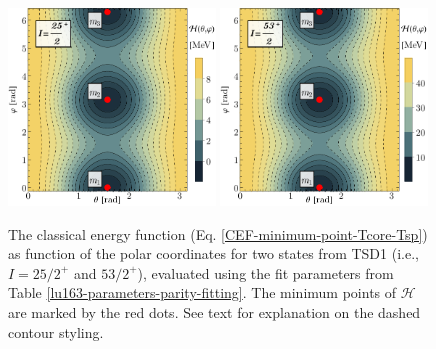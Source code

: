 \begin{figure}
    \centering
    \includegraphics[width=0.49\textwidth]{Chapters/Figures/parity-partners-plots/contour-tsd1-1.pdf}
    \includegraphics[width=0.49\textwidth]{Chapters/Figures/parity-partners-plots/contour-tsd1-2.pdf}
    \caption{The classical energy function (Eq. \ref{CEF-minimum-point-Tcore-Tsp}) as function of the polar coordinates for two states from TSD1 (i.e., $I=25/2^+$ and $53/2^+$), evaluated using the fit parameters from Table \ref{lu163-parameters-parity-fitting}. The minimum points of $\mathcal{H}$ are marked by the red dots. See text for explanation on the dashed contour styling.}
    \label{contour-cef-polar-tsd1}
\end{figure}
